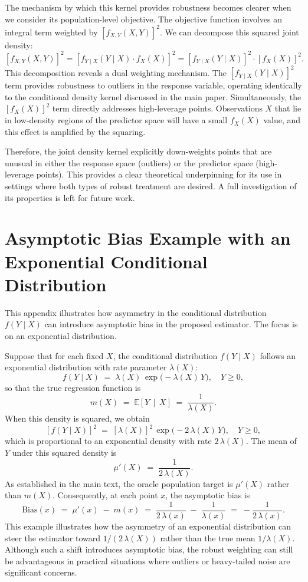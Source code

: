 \documentclass[preprint,1p,times,authoryear]{elsarticle}
\begin{document}
The mechanism by which this kernel provides robustness becomes clearer when we consider its population-level objective. The objective function involves an integral term weighted by $[f_{X,Y}(X,Y)]^2$. We can decompose this squared joint density:
\[
[f_{X,Y}(X,Y)]^2 = [f_{Y\mid X}(Y\mid X) \cdot f_X(X)]^2 = [f_{Y\mid X}(Y\mid X)]^2 \cdot [f_X(X)]^2.
\]
This decomposition reveals a dual weighting mechanism. The \textbf{$[f_{Y\mid X}(Y\mid X)]^2$} term provides robustness to outliers in the response variable, operating identically to the conditional density kernel discussed in the main paper. Simultaneously, the \textbf{$[f_X(X)]^2$} term directly addresses high-leverage points. Observations $X$ that lie in low-density regions of the predictor space will have a small $f_X(X)$ value, and this effect is amplified by the squaring.

Therefore, the joint density kernel explicitly down-weights points that are unusual in either the response space (outliers) or the predictor space (high-leverage points). This provides a clear theoretical underpinning for its use in settings where both types of robust treatment are desired. A full investigation of its properties is left for future work.

\section{Asymptotic Bias Example with an Exponential Conditional Distribution}
\label{appendix:asym_bias_example}

This appendix illustrates how asymmetry in the conditional distribution \( f(Y \mid X) \) can introduce asymptotic bias in the proposed estimator. The focus is on an exponential distribution.

Suppose that for each fixed \(X\), the conditional distribution \( f(Y \mid X)\) follows an exponential distribution with rate parameter \(\lambda(X)\):
\[
 f(Y \mid X) \;=\; \lambda(X)\,\exp\!\bigl(-\lambda(X)\,Y\bigr),
 \quad Y \ge 0,
\]
so that the true regression function is
\[
 m(X) \;=\; \mathbb{E}[Y \,\mid\, X] \;=\; \frac{1}{\lambda(X)}.
\]
When this density is squared, we obtain
\[
 [f(Y \mid X)]^2 
 \;=\; [\lambda(X)]^2 
 \,\exp\!\bigl(-2\,\lambda(X)\,Y\bigr),
 \quad Y \ge 0,
\]
which is proportional to an exponential density with rate \(2\,\lambda(X)\). The mean of \(Y\) under this squared density is
\[
 \mu'(X) 
 \;=\; \frac{1}{2\,\lambda(X)}.
\]
As established in the main text, the oracle population target is \(\mu'(X)\) rather than \(m(X)\). Consequently, at each point \(x\), the asymptotic bias is
\[
 \text{Bias}(x)
 \;=\; \mu'(x) \;-\; m(x)
 \;=\; \frac{1}{2\,\lambda(x)} \;-\; \frac{1}{\lambda(x)}
 \;=\; -\frac{1}{2\,\lambda(x)}.
\]
This example illustrates how the asymmetry of an exponential distribution can steer the estimator toward \(1/(2\,\lambda(X))\) rather than the true mean \(1/\lambda(X)\). Although such a shift introduces asymptotic bias, the robust weighting can still be advantageous in practical situations where outliers or heavy-tailed noise are significant concerns.
\end{document}
